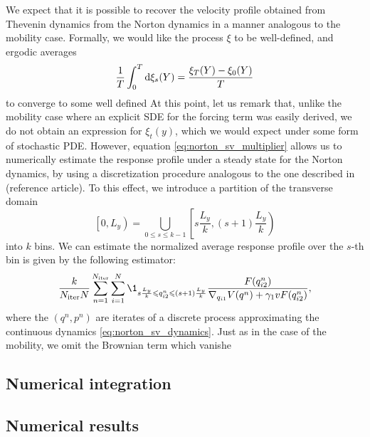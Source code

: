 We expect that it is possible to recover the velocity profile obtained from Thevenin dynamics from the Norton dynamics in a manner analogous to the mobility case. Formally, we would like the process $\xi$ to be well-defined, and ergodic averages
\[\frac 1T\int_0^T \mathrm{d} \xi_s(Y)=\frac{\xi_T(Y)-\xi_0(Y)}T\]
to converge to some well defined 
At this point, let us remark that, unlike the mobility case where an explicit SDE for the forcing term was easily derived, we do not obtain an expression for $\xi_t(y)$, which we would expect under some form of stochastic PDE.
However, equation \eqref{eq:norton_sv_multiplier} allows us to numerically estimate the response profile under a steady state for the Norton dynamics, by using a discretization procedure analogous to the one described in (reference article).
To this effect, we introduce a partition of the transverse domain 
\[\left[0,L_y\right)=\bigcup_{0\leq s\leq k-1}\left[s\frac{L_y}k,(s+1)\frac{L_y}k\right)\]
into $k$ bins. We can estimate the normalized average response profile over the $s$-th bin is given by the following estimator:
\begin{equation}
    \label{eq:norton_sv_response_estimator}
    \frac{k}{N_{\mathrm{iter}}N}\sum_{n=1}^{N_{\mathrm{iter}}}\sum_{i=1}^N\1_{s\frac{L_y}k\leq q_{i2}^n\leq (s+1)\frac{L_y}k}\frac{F(q_{i2}^n)}{\nabla_{q_{i1}}V(q^n)+\gamma_1vF(q_{i2}^n)},
\end{equation}
where the $(q^n,p^n)$ are iterates of a discrete process approximating the continuous dynamics \eqref{eq:norton_sv_dynamics}.
Just as in the case of the mobility, we omit the Brownian term which vanishe
\subsection{Numerical integration}
\subsection{Numerical results}